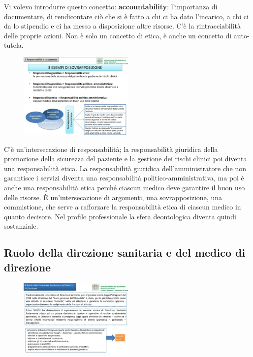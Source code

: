 Vi volevo introdurre questo concetto: \textbf{accountability}:
l'importanza di documentare, di rendicontare ciò che si è fatto a chi ci
ha dato l'incarico, a chi ci da lo stipendio e ci ha messo a
disposizione altre risorse. C'è la rintracciabilità delle proprie
azioni. Non è solo un concetto di etica, è anche un concetto di
auto-tutela.

 \begin{figure}[!ht]
\centering
	\includegraphics[width=0.5\textwidth]{32/image17.jpeg}
	\end{figure}

C'è un'intersecazione di responsabilità; la responsabilità giuridica
della promozione della sicurezza del paziente e la gestione dei rischi
clinici poi diventa una responsabilità etica. La responsabilità
giuridica dell'amministratore che non garantisce i servizi diventa una
responsabilità politico-amministrativa, ma poi è anche una
responsabilità etica perché ciascun medico deve garantire il buon uso
delle risorse. È un'intersecazione di argomenti, una sovrapposizione,
una commistione, che serve a rafforzare la responsabilità etica di
ciascun medico in quanto decisore. Nel profilo professionale la sfera
deontologica diventa quindi sostanziale.

\subsection{Ruolo della direzione sanitaria e del medico di direzione}

 \begin{figure}[!ht]
\centering
	\includegraphics[width=0.5\textwidth]{32/image18.jpeg}
	\end{figure}

